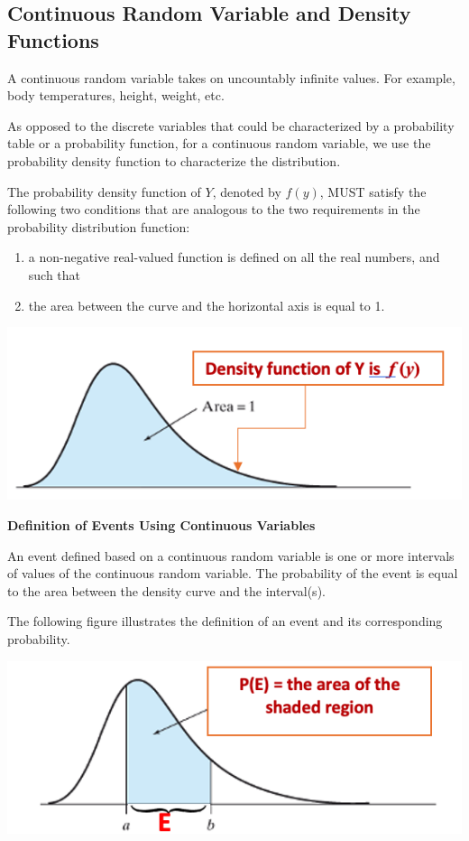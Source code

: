 \documentclass[
]{book}
\begin{document}
\hfill\break

\hypertarget{continuous-random-variable-and-density-functions}{%
\subsection{Continuous Random Variable and Density Functions}\label{continuous-random-variable-and-density-functions}}

A continuous random variable takes on uncountably infinite values. For example, body temperatures, height, weight, etc.

As opposed to the discrete variables that could be characterized by a probability table or a probability function, for a continuous random variable, we use the probability density function to characterize the distribution.

The probability density function of \(Y\), denoted by \(f(y)\), MUST satisfy the following two conditions that are analogous to the two requirements in the probability distribution function:

\begin{enumerate}
\def\labelenumi{(\arabic{enumi})}
\item
  a non-negative real-valued function is defined on all the real numbers, and such that
\item
  the area between the curve and the horizontal axis is equal to 1.
\end{enumerate}

\begin{center}\includegraphics[width=0.5\linewidth]{week03/densityCurve} \end{center}

\hfill\break

\textbf{Definition of Events Using Continuous Variables}

An event defined based on a continuous random variable is one or more intervals of values of the continuous random variable. The probability of the event is equal to the area between the density curve and the interval(s).

The following figure illustrates the definition of an event and its corresponding probability.

\begin{center}\includegraphics[width=0.5\linewidth]{week03/eventContRVProb} \end{center}
\end{document}
